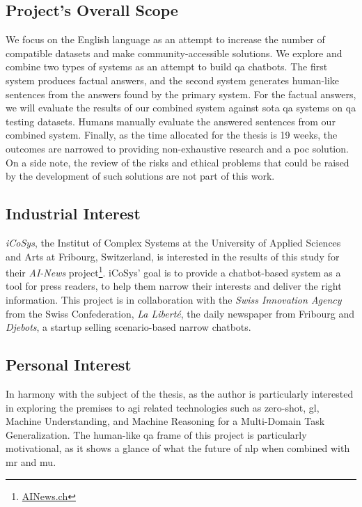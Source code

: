 \subsection{Project's Overall Scope}
We focus on the English language as an attempt to increase the number of compatible datasets and make community-accessible solutions. We explore and combine two types of systems as an attempt to build \gls{qa} chatbots. The first system produces factual answers, and the second system generates human-like sentences from the answers found by the primary system. For the factual answers, we will evaluate the results of our combined system against \gls{sota} \gls{qa} systems on \gls{qa} testing datasets. Humans manually evaluate the answered sentences from our combined system. Finally, as the time allocated for the thesis is 19 weeks, the outcomes are narrowed to providing non-exhaustive research and a \gls{poc} solution. On a side note, the review of the risks and ethical problems that could be raised by the development of such solutions are not part of this work.


\subsection{Industrial Interest}
\label{intro:icosys}
\textit{iCoSys}, the Institut of Complex Systems at the University of Applied Sciences and Arts at Fribourg, Switzerland, is interested in the results of this study for their \textit{AI-News} project\footnote{\url{AINews.ch}}. iCoSys' goal is to provide a chatbot-based system as a tool for press readers, to help them narrow their interests and deliver the right information. This project is in collaboration with the \textit{Swiss Innovation Agency} from the Swiss Confederation, \textit{La Liberté}, the daily newspaper from Fribourg and \textit{Djebots}, a startup selling scenario-based narrow chatbots.

\subsection{Personal Interest}
In harmony with the subject of the thesis, as the author is particularly interested in exploring the premises to \gls{agi} related technologies such as \gls{zero-shot}, \gls{gl}, Machine Understanding, and Machine Reasoning for a Multi-Domain Task Generalization. The human-like \gls{qa} frame of this project is particularly motivational, as it shows a glance of what the future of \gls{nlp} when combined with \gls{mr} and \gls{mu}.

